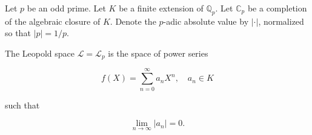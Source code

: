 Let $p$ be an odd prime. Let $K$ be a finite extension of $\mathbb{Q}_p$. Let $\mathbb{C}_p$ be a completion of the algebraic closure of $K$. Denote the $p$-adic absolute value by $|\cdot|$, normalized so that $|p| = 1/p$.

The Leopold space $\mathcal{L} = \mathcal{L}_p$ is the space of power series

$$f(X) = \sum_{n=0}^{\infty} a_n X^n, \quad a_n \in K$$

such that

$$\lim_{n \to \infty} |a_n| = 0.$$
